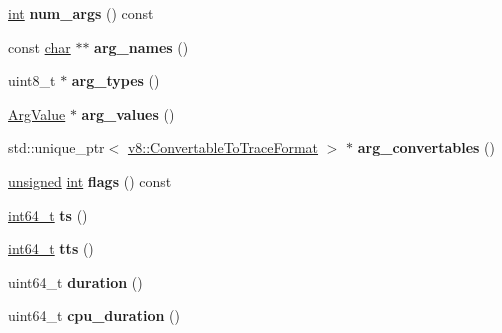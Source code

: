 \begin{DoxyCompactItemize}
\mbox{\hyperlink{classint}{int}} {\bfseries num\+\_\+args} () const
\item 
\mbox{\label{classv8_1_1platform_1_1tracing_1_1TraceObject_a91c8a7bd1af6fbeac9b44c6b94668fab}} 
const \mbox{\hyperlink{classchar}{char}} $\ast$$\ast$ {\bfseries arg\+\_\+names} ()
\item 
\mbox{\label{classv8_1_1platform_1_1tracing_1_1TraceObject_a87c3c8319757d996065fdcdf528726df}} 
uint8\+\_\+t $\ast$ {\bfseries arg\+\_\+types} ()
\item 
\mbox{\label{classv8_1_1platform_1_1tracing_1_1TraceObject_a1ff06902a7a7a25780d83b67106de10f}} 
\mbox{\hyperlink{unionv8_1_1platform_1_1tracing_1_1TraceObject_1_1ArgValue}{Arg\+Value}} $\ast$ {\bfseries arg\+\_\+values} ()
\item 
\mbox{\label{classv8_1_1platform_1_1tracing_1_1TraceObject_a9e20b05dd61b524ab744ca46be8fe2b7}} 
std\+::unique\+\_\+ptr$<$ \mbox{\hyperlink{classv8_1_1ConvertableToTraceFormat}{v8\+::\+Convertable\+To\+Trace\+Format}} $>$ $\ast$ {\bfseries arg\+\_\+convertables} ()
\item 
\mbox{\label{classv8_1_1platform_1_1tracing_1_1TraceObject_ab80f30a4e91c4abb56aeaa9e36c96591}} 
\mbox{\hyperlink{classunsigned}{unsigned}} \mbox{\hyperlink{classint}{int}} {\bfseries flags} () const
\item 
\mbox{\label{classv8_1_1platform_1_1tracing_1_1TraceObject_aafa4ee41e7b9c25fed7a77fc1a42d50c}} 
\mbox{\hyperlink{classint64__t}{int64\+\_\+t}} {\bfseries ts} ()
\item 
\mbox{\label{classv8_1_1platform_1_1tracing_1_1TraceObject_ae36c95f3b341f1d4453e3c13a91b3883}} 
\mbox{\hyperlink{classint64__t}{int64\+\_\+t}} {\bfseries tts} ()
\item 
\mbox{\label{classv8_1_1platform_1_1tracing_1_1TraceObject_aa1e75659d2248c1ff133f07454ffcf28}} 
uint64\+\_\+t {\bfseries duration} ()
\item 
\mbox{\label{classv8_1_1platform_1_1tracing_1_1TraceObject_a9fb55c21b3c20d8e1c629457676fdbbb}} 
uint64\+\_\+t {\bfseries cpu\+\_\+duration} ()
\end{DoxyCompactItemize}


